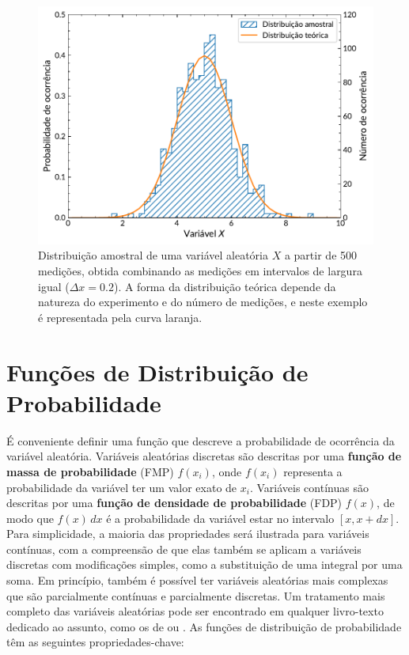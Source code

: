 \begin{figure}
	\centering
	\includegraphics[width=0.7\linewidth]{Figuras/2-1.pdf}
	\caption{Distribuição amostral de uma variável aleatória $X$ a partir de 500 medições, obtida combinando as medições em intervalos de largura igual ($\Delta x = 0.2$). A forma da distribuição teórica depende da natureza do experimento e do número de medições, e neste exemplo é representada pela curva laranja.}
	\label{fig:2-1}
\end{figure}

\section{Funções de Distribuição de Probabilidade}

É conveniente definir uma função que descreve a probabilidade de ocorrência da variável aleatória. Variáveis aleatórias discretas são descritas por uma \textbf{função de massa de probabilidade} (FMP) $f(x_i)$, onde $f(x_i)$ representa a probabilidade da variável ter um valor exato de $x_i$. Variáveis contínuas são descritas por uma \textbf{função de densidade de probabilidade} (FDP) $f(x)$, de modo que $f(x)\,dx$ é a probabilidade da variável estar no intervalo $[x, x + dx]$. Para simplicidade, a maioria das propriedades será ilustrada para variáveis contínuas, com a compreensão de que elas também se aplicam a variáveis discretas com modificações simples, como a substituição de uma integral por uma soma. Em princípio, também é possível ter variáveis aleatórias mais complexas que são parcialmente contínuas e parcialmente discretas. Um tratamento mais completo das variáveis aleatórias pode ser encontrado em qualquer livro-texto dedicado ao assunto, como os de \citet{ross2019introduction} ou \citet{siegrist2019random}. As funções de distribuição de probabilidade têm as seguintes propriedades-chave:

